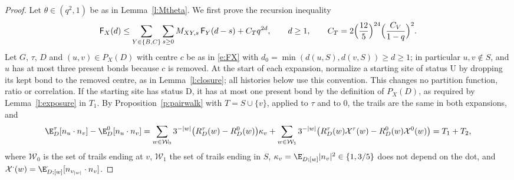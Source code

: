 \begin{proof}
Let $\theta \in (q^2, 1)$ be as in Lemma~\ref{l:Mtheta}. We first prove the recursion inequality
\begin{equation}\label{e:recineq}
\mathsf F_X(d) \le \sum_{Y \in \{B, C\}} \sum_{s \ge 0} M_{XY, s} \, \mathsf F_Y(d - s) + C_T q^{2d}, \qquad d \ge 1, \qquad C_T = 2 \Bigl( \frac{12}{5} \Bigr)^{24} \Bigl( \frac{C_V}{1 - q} \Bigr)^2 .
\end{equation}
Let $G$, $\tau$, $D$ and $(u, v) \in P_X(D)$ with centre $c$ be as in \eqref{e:FX} with $d_0 = \min(d(u, S), d(v, S)) \ge d \ge 1$; in particular $u, v \notin S$, and $u$ has at most three present bonds because $c$ is removed. At the start of each expansion, normalize a starting site of status $\mathrm U$ by dropping its kept bond to the removed centre, as in Lemma~\ref{l:closure}; all histories below use this convention. This changes no partition function, ratio or correlation. If the starting site has status $\mathrm D$, it has at most one present bond by the definition of $P_X(D)$, as required by Lemma~\ref{l:exposure} in $T_1$. By Proposition~\ref{p:pairwalk} with $T = S \cup \{v\}$, applied to $\tau$ and to $0$, the trails are the same in both expansions, and
\begin{equation*}
\E^\tau_D[n_u \cdot n_v] - \E^0_D[n_u \cdot n_v] = \sum_{w \in \mathcal W_0} 3^{-|w|} \bigl( R^\tau_D(w) - R^0_D(w) \bigr) \kappa_v + \sum_{w \in \mathcal W_1} 3^{-|w|} \bigl( R^\tau_D(w) \mathcal X^\tau(w) - R^0_D(w) \mathcal X^0(w) \bigr) = T_1 + T_2,
\end{equation*}
where $\mathcal W_0$ is the set of trails ending at $v$, $\mathcal W_1$ the set of trails ending in $S$, $\kappa_v = \E^\cdot_{D;[w]}|n_v|^2 \in \{1, 3/5\}$ does not depend on the dot, and $\mathcal X^\cdot(w) = \E^\cdot_{D;[w]}[n_{v_{|w|}} \cdot n_v]$.


\end{proof}
